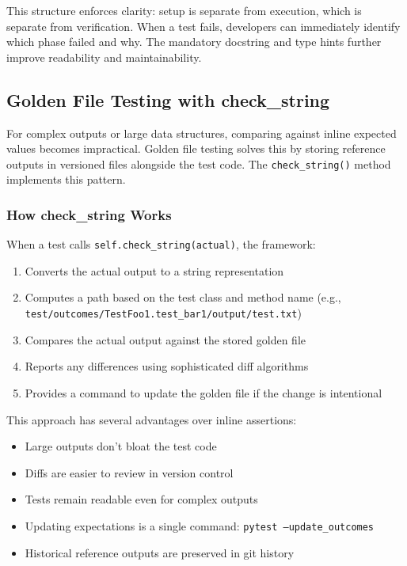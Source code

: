This structure enforces clarity: setup is separate from execution, which
is separate from verification. When a test fails, developers can immediately
identify which phase failed and why. The mandatory docstring and type
hints further improve readability and maintainability.

\subsection{Golden File Testing with check\_string}
For complex outputs or large data structures, comparing against inline expected
values becomes impractical. Golden file testing solves this by storing
reference outputs in versioned files alongside the test code.
The \texttt{check\_string()} method implements this pattern.

\subsubsection{How check\_string Works}
When a test calls \texttt{self.check\_string(actual)}, the framework:
\begin{enumerate}
  \item Converts the actual output to a string representation

  \item Computes a path based on the test class and method name (e.g.,
    \texttt{test/outcomes/TestFoo1.test\_bar1/output/test.txt})

  \item Compares the actual output against the stored golden file

  \item Reports any differences using sophisticated diff algorithms

  \item Provides a command to update the golden file if the change is intentional
\end{enumerate}

This approach has several advantages over inline assertions:
\begin{itemize}
  \item Large outputs don't bloat the test code

  \item Diffs are easier to review in version control

  \item Tests remain readable even for complex outputs

  \item Updating expectations is a single command: \texttt{pytest --update\_outcomes}

  \item Historical reference outputs are preserved in git history
\end{itemize}

